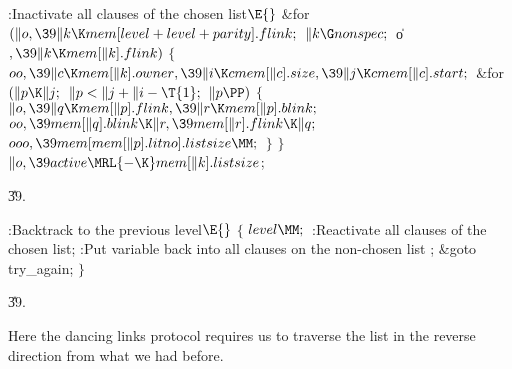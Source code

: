\Y\B\4:Inactivate all clauses of the chosen list\X${}\E{}$\6
\&{for} ${}(\|o,\39\|k\K\\{mem}[\\{level}+\\{level}+\\{parity}].\\{flink};{}$
${}\|k\G\\{nonspec};{}$ \|o${},\39\|k\K\\{mem}[\|k].\\{flink}){}$\5
${}\{{}$\1\6
${}\\{oo},\39\|c\K\\{mem}[\|k].\\{owner},\39\|i\K\\{cmem}[\|c].\\{size},\39\|j%
\K\\{cmem}[\|c].\\{start};{}$\6
\&{for} ${}(\|p\K\|j;{}$ ${}\|p<\|j+\|i-\T{1};{}$ ${}\|p\PP){}$\5
${}\{{}$\1\6
${}\|o,\39\|q\K\\{mem}[\|p].\\{flink},\39\|r\K\\{mem}[\|p].\\{blink};{}$\6
${}\\{oo},\39\\{mem}[\|q].\\{blink}\K\|r,\39\\{mem}[\|r].\\{flink}\K\|q;{}$\6
${}\\{ooo},\39\\{mem}[\\{mem}[\|p].\\{litno}].\\{listsize}\MM;{}$\6
\4${}\}{}$\2\6
\4${}\}{}$\2\6
${}\|o,\39\\{active}\MRL{-{\K}}\\{mem}[\|k].\\{listsize}{}$;\par
\U39.\fi

\B{}:Backtrack to the previous level\X${}\E{}$\6
${}\{{}$\1\6
${}\\{level}\MM;{}$\6
:Reactivate all clauses of the chosen list\X;\6
:Put variable  back into all clauses on the non-chosen list%
\X;\6
\&{goto} \\{try\_again};\6
\4${}\}{}$\2\par
\U39.\fi

Here the dancing links protocol requires us to traverse the
list
in the reverse direction from what we had before.

